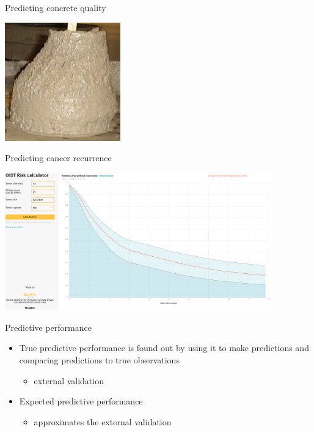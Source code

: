 \documentclass[english,t]{beamer}
\begin{document}
\begin{frame}{}

  {\Large\color{navyblue} Predicting concrete quality}

  \begin{center}
    \includegraphics[width=5cm]{slump1b.eps}
  \end{center}
  
\end{frame}

\begin{frame}{}

  {\Large\color{navyblue} Predicting cancer recurrence}

  \begin{center}
    \includegraphics[width=11.5cm]{gistrisk.png}
  \end{center}
  
\end{frame}

\begin{frame}
  
  {\Large\color{navyblue} Predictive performance}

  \begin{itemize}
  \item<1-> True predictive performance is found out by using it to make
    predictions and comparing predictions to true observations
    \begin{itemize}
      \item external validation
    \end{itemize}
  \item<2-> Expected predictive performance
    \begin{itemize}
      \item approximates the external validation
      \end{itemize}
    \end{itemize}

\end{frame}
\end{document}
